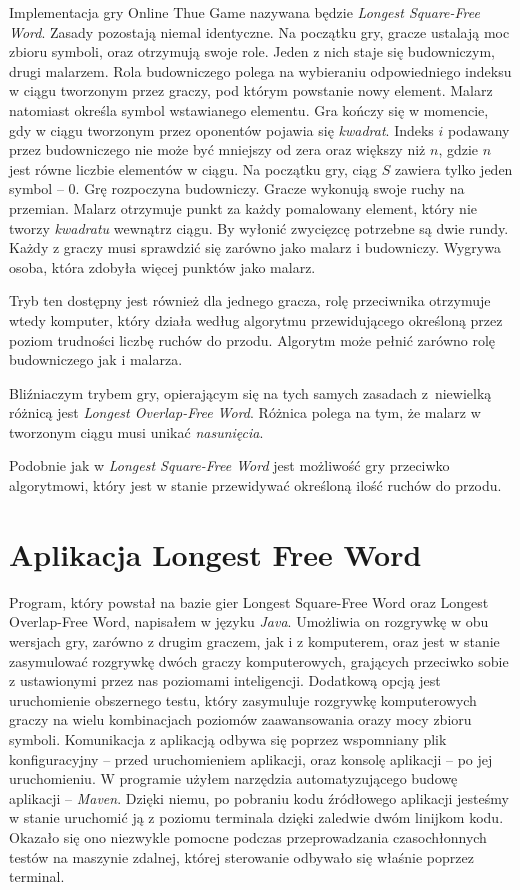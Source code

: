 \documentclass[document]{xmgr}
\begin{document}
Implementacja gry Online Thue Game nazywana będzie \emph{Longest Squa\-re-Free Word}.
Zasady pozostają niemal identyczne. Na początku gry, gracze ustalają moc zbioru symboli, oraz otrzymują swoje role. Jeden z nich staje się budowniczym, drugi malarzem. Rola budowniczego polega na wybieraniu odpowiedniego indeksu w ciągu tworzonym przez graczy, pod którym powstanie nowy element. Malarz natomiast określa symbol wstawianego elementu. Gra kończy się w momencie, gdy w ciągu tworzonym przez oponentów pojawia się \emph{kwadrat}. Indeks $i$  podawany przez budowniczego nie może być mniejszy od zera oraz większy niż $n$, gdzie $n$ jest równe liczbie elementów w ciągu. Na początku gry, ciąg $S$ zawiera tylko jeden symbol -- $0$.
Grę rozpoczyna budowniczy. Gracze wykonują swoje ruchy na przemian. Malarz otrzymuje punkt za każdy pomalowany element, który nie tworzy \emph{kwadratu} wewnątrz ciągu.
By wyłonić zwycięzcę potrzebne są dwie rundy. Każdy z graczy musi sprawdzić się zarówno jako malarz i budowniczy. Wygrywa osoba, która zdobyła więcej punktów jako malarz.

Tryb ten dostępny jest również dla jednego gracza, rolę przeciwnika otrzymuje wtedy komputer, który działa według algorytmu przewidującego określoną przez poziom trudności liczbę ruchów do przodu. Algorytm może pełnić zarówno rolę budowniczego jak i malarza.

Bliźniaczym trybem gry, opierającym się na tych samych zasadach z~niewielką różnicą jest \emph{Longest Overlap-Free Word}. 
Różnica polega na tym, że malarz w tworzonym ciągu musi unikać \emph{nasunięcia}.

Podobnie jak w \emph{Longest Square-Free Word} jest możliwość gry przeciwko algorytmowi, który jest w stanie przewidywać określoną ilość ruchów do przodu.

\chapter{Aplikacja Longest Free Word}
Program, który powstał na bazie gier Longest Square-Free Word oraz Longest Overlap-Free Word, napisałem w języku \textit{Java}. Umożliwia on rozgrywkę w obu wersjach gry, zarówno z drugim graczem, jak i z komputerem, oraz jest w stanie zasymulować rozgrywkę dwóch graczy komputerowych, grających przeciwko sobie z ustawionymi przez nas poziomami inteligencji. Dodatkową opcją jest uruchomienie obszernego testu, który zasymuluje rozgrywkę komputerowych graczy na wielu kombinacjach poziomów zaawansowania orazy mocy zbioru symboli. Komunikacja z aplikacją odbywa się poprzez wspomniany plik konfiguracyjny -- przed uruchomieniem aplikacji, oraz konsolę aplikacji -- po jej uruchomieniu. W programie użyłem narzędzia automatyzującego budowę aplikacji -- \textit{Maven}. Dzięki niemu, po pobraniu kodu źródłowego aplikacji jesteśmy w stanie uruchomić ją z poziomu terminala dzięki zaledwie dwóm linijkom kodu. Okazało się ono niezwykle pomocne podczas przeprowadzania czasochłonnych testów na maszynie zdalnej, której sterowanie odbywało się właśnie poprzez terminal.
\end{document}
